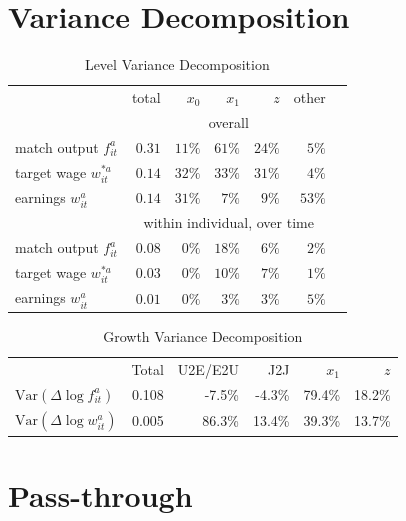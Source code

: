 \documentclass{article}
\begin{document}
\newpage

\section{Variance Decomposition}

\begin{table}[htpb]
    \caption{Level Variance Decomposition}
    \label{tab:level_variance_decomposition}
    \centering
    \begin{tabular}{l r r r r r r} 
        \toprule 
         & total & $x_0$ & $x_1$ & $z$ & other\\[4pt]
         & \multicolumn{5}{c}{overall}\\[-3pt]
         \cmidrule(lr){2-6}
        match output $f^a_{it}$ & $0.31$ & $11\%$ & $61\%$ & $24\%$ & $5\%$\\
        target wage $w^{*a}_{it}$ & $0.14$ & $32\%$ & $33\%$ & $31\%$ & $4\%$\\
        earnings $w^a_{it}$ & $0.14$ & $31\%$ & $7\%$ & $9\%$ & $53\%$\\[5pt]
         & \multicolumn{5}{c}{within individual, over time}\\[-3pt]
         \cmidrule(lr){2-6}
        match output $f^a_{it}$ & $0.08$ & $0\%$ & $18\%$ & $6\%$ & $2\%$\\
        target wage $w^{*a}_{it}$ & $0.03$ & $0\%$ & $10\%$ & $7\%$ & $1\%$\\
        earnings $w^a_{it}$ & $0.01$ & $0\%$ & $3\%$ & $3\%$ & $5\%$\\
        \bottomrule 
    \end{tabular}    
\end{table}

\begin{table}[htpb]
    \caption{Growth Variance Decomposition}
    \label{tab:growth_variance_decomposition}
    \centering
    \begin{tabular}{l r r r r r} 
        \toprule 
         & Total & U2E/E2U & J2J & $x_1$ & $z$\\
         \cmidrule(lr){2-6}
        $\text{Var}(\Delta\log f^a_{it})$ & 0.108 & -7.5\% & -4.3\% & 79.4\% & 18.2\%\\
        $\text{Var}(\Delta\log w^a_{it}) $ & 0.005 & 86.3\% & 13.4\% & 39.3\% & 13.7\%\\
        \bottomrule 
        \end{tabular}
\end{table}


\section{Pass-through}
\end{document}
